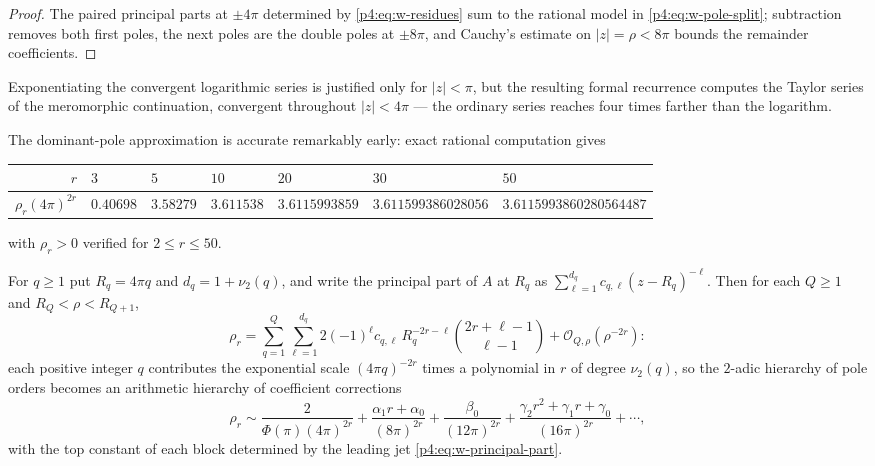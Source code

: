\documentclass[11pt,oneside]{article}
\numberwithin{equation}{section}
\theoremstyle{definition}
\theoremstyle{remark}
\newcommand{\vtwo}{\nu_2}
\newcommand{\bigO}{\mathcal O}
\begin{document}
\begin{proof}
The paired principal parts at $\pm4\pi$ determined by
\eqref{p4:eq:w-residues} sum to the rational model in
\eqref{p4:eq:w-pole-split}; subtraction removes both first poles, the next
poles are the double poles at $\pm8\pi$, and Cauchy's estimate on
$|z|=\rho<8\pi$ bounds the remainder coefficients.
\end{proof}

Exponentiating the convergent logarithmic series is justified only for
$|z|<\pi$, but the resulting formal recurrence computes the Taylor series of
the meromorphic continuation, convergent throughout $|z|<4\pi$ --- the
ordinary series reaches four times farther than the logarithm.

The dominant-pole approximation is accurate remarkably early: exact rational
computation gives
\begin{center}
\footnotesize
\begin{tabular}{@{}rllllll@{}}
\toprule
$r$ & $3$ & $5$ & $10$ & $20$ & $30$ & $50$\\
\midrule
$\rho_r(4\pi)^{2r}$ & $0.40698$ & $3.58279$ & $3.611538$
 & $3.6115993859$ & $3.611599386028056$ & $3.6115993860280564487$\\
\bottomrule
\end{tabular}
\end{center}
with $\rho_r>0$ verified for $2\le r\le50$.

\begin{proposition}
\label{p4:prop:w-darboux}
For $q\ge1$ put $R_q=4\pi q$ and $d_q=1+\vtwo(q)$, and write the principal
part of $A$ at $R_q$ as
$\sum_{\ell=1}^{d_q}c_{q,\ell}(z-R_q)^{-\ell}$.  Then for each $Q\ge1$ and
$R_Q<\rho<R_{Q+1}$,
\begin{equation}
 \rho_r=\sum_{q=1}^{Q}\sum_{\ell=1}^{d_q}
 2(-1)^\ell c_{q,\ell}\,R_q^{-2r-\ell}
 \binom{2r+\ell-1}{\ell-1}
 +\bigO_{Q,\rho}(\rho^{-2r}):
 \label{p4:eq:w-darboux}
\end{equation}
each positive integer $q$ contributes the exponential scale $(4\pi q)^{-2r}$
times a polynomial in $r$ of degree $\vtwo(q)$, so the $2$-adic hierarchy of
pole orders becomes an arithmetic hierarchy of coefficient corrections
\begin{equation}
 \rho_r\sim\frac{2}{\Phi(\pi)(4\pi)^{2r}}
 +\frac{\alpha_1r+\alpha_0}{(8\pi)^{2r}}
 +\frac{\beta_0}{(12\pi)^{2r}}
 +\frac{\gamma_2r^2+\gamma_1r+\gamma_0}{(16\pi)^{2r}}+\cdots,
 \label{p4:eq:w-transseries}
\end{equation}
with the top constant of each block determined by the leading jet
\eqref{p4:eq:w-principal-part}.
\end{proposition}
\end{document}
